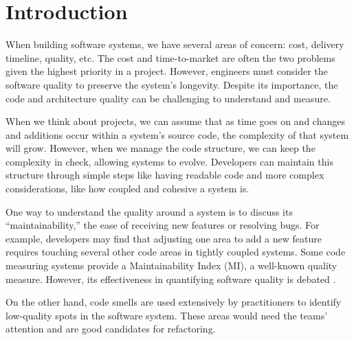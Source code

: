 \chapter{Introduction} \label{sectionIntroduction}

When building software systems, we have several areas of concern: cost, delivery timeline, quality, etc. The cost and time-to-market are often the two problems given the highest priority in a project. However, engineers must consider the software quality to preserve the system's longevity. Despite its importance, the code and architecture quality can be challenging to understand and measure.

When we think about projects, we can assume that as time goes on and changes and additions occur within a system's source code, the complexity of that system will grow. However, when we manage the code structure, we can keep the complexity in check, allowing systems to evolve. Developers can maintain this structure through simple steps like having readable code and more complex considerations, like how coupled and cohesive a system is.

One way to understand the quality around a system is to discuss its ``maintainability,'' the ease of receiving new features or resolving bugs. For example, developers may find that adjusting one area to add a new feature requires touching several other code areas in tightly coupled systems. Some code measuring systems provide a Maintainability Index (MI), a well-known quality measure. However, its effectiveness in quantifying software quality is debated \cite{vandeursen:2014}.

On the other hand, code smells are used extensively by practitioners to identify low-quality spots in the software system. These areas would need the teams' attention and are good candidates for refactoring.
